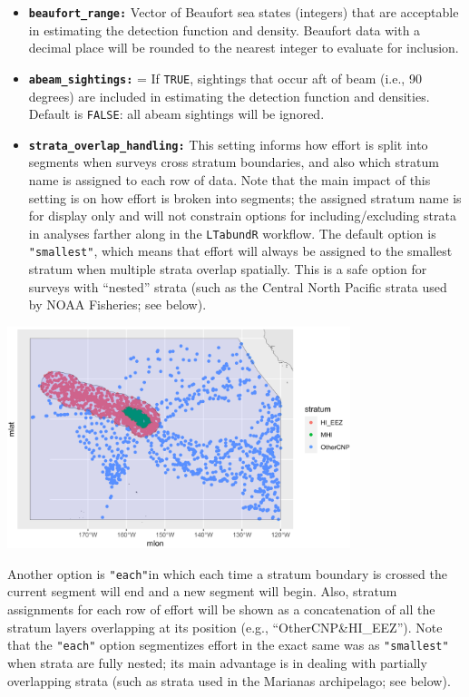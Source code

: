 \documentclass[
]{book}
\begin{document}
\begin{itemize}
\item
  \textbf{\texttt{beaufort\_range:}} Vector of Beaufort sea states (integers) that are acceptable in estimating the detection function and density. Beaufort data with a decimal place will be rounded to the nearest integer to evaluate for inclusion.
\item
  \textbf{\texttt{abeam\_sightings:}} = If \texttt{TRUE}, sightings that occur aft of beam (i.e., 90 degrees) are included in estimating the detection function and densities. Default is \texttt{FALSE}: all abeam sightings will be ignored.
\item
  \textbf{\texttt{strata\_overlap\_handling:}} This setting informs how effort is split into segments when surveys cross stratum boundaries, and also which stratum name is assigned to each row of data. Note that the main impact of this setting is on how effort is broken into segments; the assigned stratum name is for display only and will not constrain options for including/excluding strata in analyses farther along in the \texttt{LTabundR} workflow. The default option is \texttt{"smallest"}, which means that effort will always be assigned to the smallest stratum when multiple strata overlap spatially. This is a safe option for surveys with ``nested'' strata (such as the Central North Pacific strata used by NOAA Fisheries; see below).
\end{itemize}

\includegraphics[width=0.75\textwidth,height=\textheight]{img/strata_overlap_hiceas.png}

Another option is \texttt{"each"}in which each time a stratum boundary is crossed the current segment will end and a new segment will begin. Also, stratum assignments for each row of effort will be shown as a concatenation of all the stratum layers overlapping at its position (e.g., ``OtherCNP\&HI\_EEZ''). Note that the \texttt{"each"} option segmentizes effort in the exact same was as \texttt{"smallest"} when strata are fully nested; its main advantage is in dealing with partially overlapping strata (such as strata used in the Marianas archipelago; see below).
\end{document}
